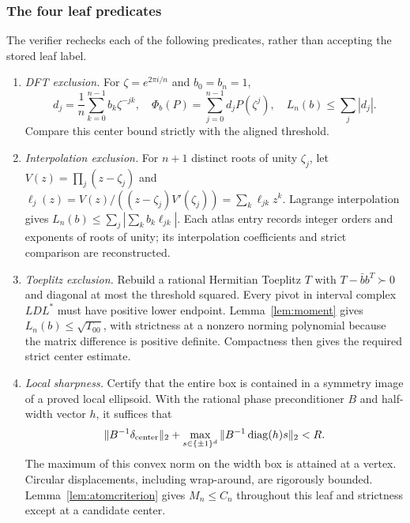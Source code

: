 \documentclass[11pt]{article}
\newcommand{\diag}{\operatorname{diag}}
\begin{document}
\subsubsection{The four leaf predicates}
The verifier rechecks each of the following predicates, rather than
accepting the stored leaf label.
\begin{enumerate}[leftmargin=*]
\item \emph{DFT exclusion.} For $\zeta=e^{2\pi i/n}$ and $b_0=b_n=1$,
\[
 d_j=\frac1n\sum_{k=0}^{n-1}b_k\zeta^{-jk},\quad
 \Phi_b(P)=\sum_{j=0}^{n-1}d_jP(\zeta^j),\quad L_n(b)\le\sum_j|d_j|.
\]
Compare this center bound strictly with the aligned threshold.
\item \emph{Interpolation exclusion.} For $n+1$ distinct roots of unity
$\zeta_j$, let $V(z)=\prod_j(z-\zeta_j)$ and
$\ell_j(z)=V(z)/((z-\zeta_j)V'(\zeta_j))=\sum_k\ell_{jk}z^k$.
Lagrange interpolation gives
$L_n(b)\le\sum_j|\sum_kb_k\ell_{jk}|$.
Each atlas entry records integer orders and exponents of roots of unity;
its interpolation coefficients and strict comparison are reconstructed.
\item \emph{Toeplitz exclusion.} Rebuild a rational Hermitian Toeplitz
$T$ with $T-\bar b b^T\succ0$ and diagonal at most the threshold squared.
Every pivot in interval complex $LDL^*$ must have positive lower endpoint.
Lemma~\ref{lem:moment} gives $L_n(b)\le\sqrt{T_{00}}$, with strictness
at a nonzero norming polynomial because the matrix difference is positive
definite. Compactness then gives the required strict center estimate.
\item \emph{Local sharpness.} Certify that the entire box is contained
in a symmetry image of a proved local ellipsoid. With the rational phase
preconditioner $B$ and half-width vector $h$, it suffices that
\begin{equation}\label{eq:localbox}
 \|B^{-1}\delta_{\rm center}\|_2+
 \max_{s\in\{\pm1\}^d}\|B^{-1}\diag(h)s\|_2<R.
\end{equation}
The maximum of this convex norm on the width box is attained at a
vertex. Circular displacements, including wrap-around, are rigorously
bounded. Lemma~\ref{lem:atomcriterion} gives $M_n\le C_n$ throughout
this leaf and strictness except at a candidate center.
\end{enumerate}
\end{document}
